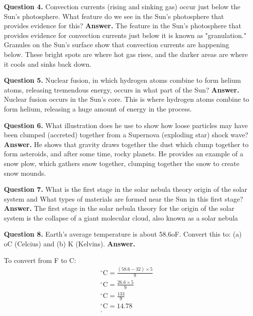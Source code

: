 \documentclass{report}
\begin{document}
    \bigbreak \noindent 
    \textbf{Question 4.} Convection currents (rising and sinking gas) occur just below the Sun’s photosphere.  What feature do we see in the Sun’s photosphere that provides evidence for this?
    \bigbreak \noindent 
    \textbf{Answer.} The feature in the Sun's photosphere that provides evidence for convection currents just below it is known as "granulation." Granules on the Sun's surface show that convection currents are happening below. These bright spots are where hot gas rises, and the darker areas are where it cools and sinks back down.

    \bigbreak \noindent 
    \textbf{Question 5.} Nuclear fusion, in which hydrogen atoms combine to form helium atoms, releasing tremendous energy, occurs in what part of the Sun? 
    \bigbreak \noindent 
    \textbf{Answer.} Nuclear fusion occurs in the Sun's core. This is where hydrogen atoms combine to form helium, releasing a huge amount of energy in the process.

    \bigbreak \noindent 
    \textbf{Question 6.} What illustration does he use to show how loose particles may have been clumped (accreted) together from a Supernova (exploding star) shock wave?
    \bigbreak \noindent 
    \textbf{Answer.} He shows that gravity draws together the dust which clump together to form  asteroids, and after some time, rocky planets. He provides an example of a snow plow, which gathers snow together, clumping together the snow to create snow mounds.

    \bigbreak \noindent 
    \textbf{Question 7.} What is the first stage in the solar nebula theory origin of the solar system and What types of materials are formed near the Sun in this first stage?
    \bigbreak \noindent 
    \textbf{Answer.} The first stage in the solar nebula theory for the origin of the solar system is the collapse of a giant molecular cloud, also known as a solar nebula

    \bigbreak \noindent 
    \textbf{Question 8.} Earth’s average temperature is about 58.6oF. Convert this to:  (a) oC (Celcius) and (b) K (Kelvins).
    \bigbreak \noindent 
    \textbf{Answer.} 
    \bigbreak \noindent 

    To convert from F to C: 
    \begin{align*}
        ^\circ\text{C} = \frac{( 58.6 - 32 ) \times 5}{9} \\
        ^\circ\text{C} = \frac{26.6 \times 5}{9} \\
        ^\circ\text{C} = \frac{133}{9} \\
        ^\circ\text{C} = 14.78 \\
    .\end{align*}
\end{document}

